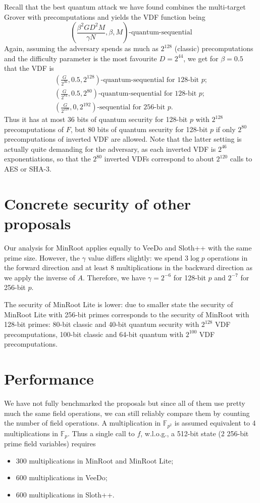 \documentclass{article}
\begin{document}
Recall that the best quantum attack we have found combines the  multi-target Grover with precomputations and yields the VDF function being 
$$
\left(\frac{\beta^2 G D^2M}{\gamma N},\beta,M\right)\text{-quantum-sequential}
$$
Again, assuming the adversary spends as much as $2^{128}$ (classic) precomputations
and the difficulty parameter is the most favourite $D=2^{44}$, we get for $\beta=0.5$ that the VDF is
\begin{align}
(\frac{G}{2^{36}},0.5,2^{128})\text{-quantum-sequential for 128-bit }p;\\
(\frac{G}{2^{84}},0.5,2^{80})\text{-quantum-sequential for 128-bit }p;\\
(\frac{G}{2^{228}},0,2^{192})\text{-sequential for 256-bit }p.
\end{align}
Thus it has at most $36$ bits of quantum security for 128-bit $p$ with $2^{128}$ precomputations of $F$, but 80 bits of quantum security for 128-bit $p$ if only $2^{80}$ precomputations of inverted VDF are allowed. Note that the latter setting is actually quite demanding for the adversary, as each inverted VDF is $2^{46}$ exponentiations, so that the $2^{80}$ inverted VDFs correspond to about $2^{120}$ calls to AES or SHA-3. 


\section{Concrete security of other proposals}

Our analysis for MinRoot applies equally to VeeDo and Sloth++ with the same prime size. However, the $\gamma$ value differs slightly: we spend $3\log p$ operations in the forward direction and at least $8$ multiplications in the backward direction as we apply the inverse of $A$. Therefore, we have $\gamma = 2^{-6}$ for 128-bit $p$ and $2^{-7}$ for 256-bit $p$.

The security of MinRoot Lite is lower: due to smaller state the security of MinRoot Lite with 256-bit primes corresponds to the security of MinRoot with 128-bit primes: 80-bit classic and 40-bit quantum security with $2^{128}$ VDF precomputations, 100-bit classic and 64-bit quantum with $2^{100}$ VDF precomputations.

\section{Performance}

We have not fully benchmarked the proposals but since all of them use pretty much the same field operations, we can still reliably compare them by counting the number of field operations. A multiplication in $\mathbb{F}_{p^2}$ is assumed equivalent to 4 multiplications in $\mathbb{F}_p$. Thus a single call to $f$, w.l.o.g., a 512-bit state (2 256-bit prime field variables) requires 
\begin{itemize}
    \item 300 multiplications in MinRoot and MinRoot Lite;
    \item  600 multiplications in VeeDo;
    \item 600 multiplications in Sloth++.
\end{itemize}
\end{document}

